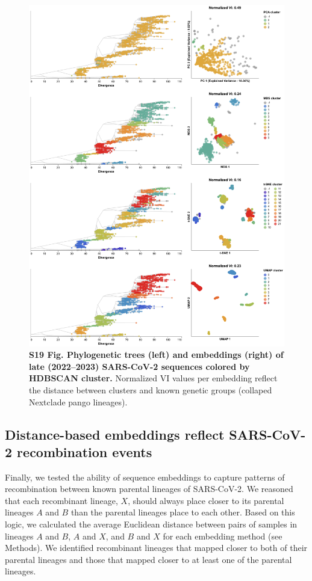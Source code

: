 \documentclass[10pt,letterpaper]{article}
\begin{document}
\begin{figure}[!h]
\includegraphics[width=\columnwidth]{figures/sarscov2-test-embeddings-by-cluster-vs-Nextclade_pango_collapsed.png}
\caption*{{\bf S19 Fig. Phylogenetic trees (left) and embeddings (right) of late (2022--2023) SARS-CoV-2 sequences colored by HDBSCAN cluster.}
  Normalized VI values per embedding reflect the distance between clusters and known genetic groups (collaped Nextclade pango lineages).
}
\end{figure}

\subsection*{Distance-based embeddings reflect SARS-CoV-2 recombination events}

Finally, we tested the ability of sequence embeddings to capture patterns of recombination between known parental lineages of SARS-CoV-2.
We reasoned that each recombinant lineage, $X$, should always place closer to its parental lineages $A$ and $B$ than the parental lineages place to each other.
Based on this logic, we calculated the average Euclidean distance between pairs of samples in lineages $A$ and $B$, $A$ and $X$, and $B$ and $X$ for each embedding method (see Methods).
We identified recombinant lineages that mapped closer to both of their parental lineages and those that mapped closer to at least one of the parental lineages.
\end{document}
